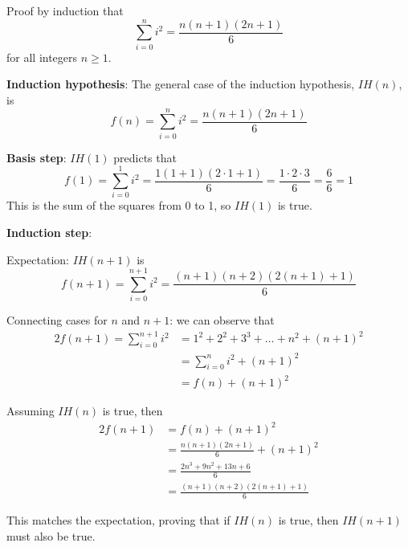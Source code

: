 \documentclass{article}
\begin{document}
Proof by induction that
\[ \sum_{i=0}^{n}{i^2} = \frac{n(n+1)(2n+1)}{6} \] for all integers $n \ge 1$.

{\bf Induction hypothesis}: The general case of the induction hypothesis, $IH(n)$, is
\[ f(n) = \sum_{i=0}^{n}{i^2} = \frac{n(n+1)(2n+1)}{6} \]

{\bf Basis step}: $IH(1)$ predicts that
\[ f(1) = \sum_{i=0}^{1}{i^2} = \frac{1(1+1)(2\cdot 1+1)}{6} = \frac{1\cdot 2\cdot 3}{6} = \frac{6}{6} = 1 \]
This is the sum of the squares from 0 to 1, so $IH(1)$ is true.

{\bf Induction step}:

Expectation: $IH(n+1)$ is
\[ f(n+1) = \sum_{i=0}^{n+1}{i^2} = \frac{(n+1)(n+2)(2(n+1)+1)}{6} \]

Connecting cases for $n$ and $n+1$: we can observe that
\begin{alignat*}{2}
f(n+1) = \sum_{i=0}^{n+1}{i^2} &= 1^2 + 2^2 + 3^3 + \ldots + n^2 + (n+1)^2 \\
                               &= \sum_{i=0}^{n}{i^2} + (n+1)^2 \\
                               &= f(n) + (n+1)^2
\end{alignat*}

Assuming $IH(n)$ is true, then
\begin{alignat*}{2}
f(n+1) &= f(n) + (n+1)^2 \\
       &= \frac{n(n+1)(2n+1)}{6} + (n+1)^2 \\
       &= \frac{2n^3 + 9n^2 + 13n + 6}{6} \\
       &= \frac{(n+1)(n+2)(2(n+1)+1)}{6}
\end{alignat*}

This matches the expectation, proving that if $IH(n)$ is true, then $IH(n+1)$ must also
be true.
\end{document}
